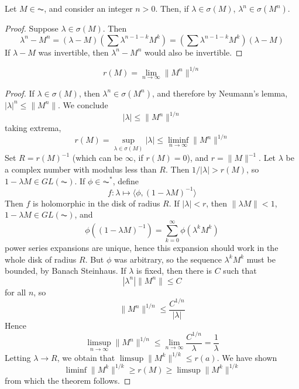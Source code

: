 \begin{lemma}
    Let $M \in \AC$, and consider an integer $n > 0$. Then, if $\lambda \in \sigma(M)$, $\lambda^n \in \sigma(M^n)$.
\end{lemma}
\begin{proof}
    Suppose $\lambda \in \sigma(M)$. Then
    \[ \lambda^n - M^n = (\lambda - M) \left(\sum \lambda^{n-1-k} M^k \right) = \left(\sum \lambda^{n-1-k} M^k \right) (\lambda - M) \]
    If $\lambda - M$ was invertible, then $\lambda^n - M^n$ would also be invertible.
\end{proof}

\begin{theorem}
    \[ r(M) = \lim_{n \to \infty} \| M^n \|^{1/n} \]
\end{theorem}
\begin{proof}
    If $\lambda \in \sigma(M)$, then $\lambda^n \in \sigma(M^n)$, and therefore by Neumann's lemma, $|\lambda|^n \leq \| M^n \|$. We conclude
    \[ |\lambda| \leq \| M^n \|^{1/n} \]
    taking extrema,
    \[ r(M) = \sup_{\lambda \in \sigma(M)} |\lambda| \leq \liminf_{n \to \infty} \|M^n\|^{1/n} \]
    Set $R = r(M)^{-1}$ (which can be $\infty$, if $r(M) = 0$), and $r = \|M\|^{-1}$. Let $\lambda$ be a complex number with modulus less than $R$. Then $1/|\lambda| > r(M)$, so $1 - \lambda M \in GL(\AC)$. If $\phi \in \AC^*$, define
    \[ f: \lambda \mapsto \langle \phi, (1 - \lambda M)^{-1} \rangle \]
    Then $f$ is holomorphic in the disk of radius $R$. If $|\lambda| < r$, then $\| \lambda M \| < 1$, $1 - \lambda M \in GL(\AC)$, and
    \[ \phi \left( (1 - \lambda M)^{-1} \right) = \sum_{k = 0}^\infty \phi( \lambda^k M^k) \]
    power series expansions are unique, hence this expansion should work in the whole disk of radius $R$. But $\phi$ was arbitrary, so the sequence $\lambda^k M^k$ must be bounded, by Banach Steinhaus. If $\lambda$ is fixed, then there is $C$ such that
    \[ |\lambda^n| \|M^n\| \leq C \]
    for all $n$, so
    \[ \|M^n\|^{1/n} \leq \frac{C^{1/n}}{|\lambda|} \]
    Hence
    \[ \limsup_{n \to \infty} \|M^n\|^{1/n} \leq \lim_{n \to \infty} \frac{C^{1/n}}{\lambda} = \frac{1}{\lambda} \]
    Letting $\lambda \to R$, we obtain that $\limsup \|M^k\|^{1/k} \leq r(a)$. We have shown
    \[ \liminf \|M^k\|^{1/k} \geq r(M) \geq \limsup \|M^k\|^{1/k} \]
    from which the theorem follows.
\end{proof}

